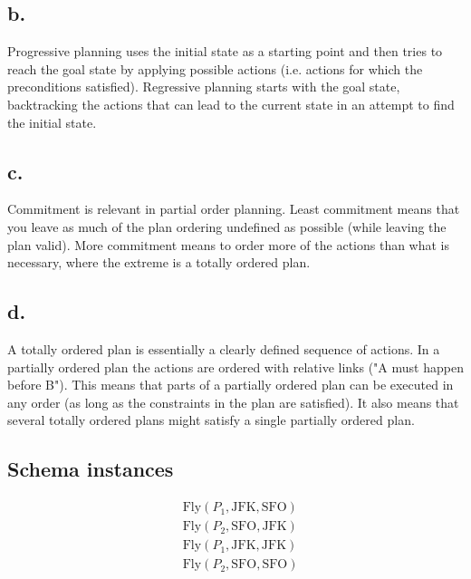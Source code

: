 \documentclass[a4paper, english, 11pt]{article}
\begin{document}
\subsection*{b.}
Progressive planning uses the initial state as a starting point and then tries
to reach the goal state by applying possible actions (i.e. actions for which
the preconditions satisfied). Regressive planning starts with the goal state,
backtracking the actions that can lead to the current state in an attempt to
find the initial state.

\subsection*{c.}
Commitment is relevant in partial order planning. Least commitment means that
you leave as much of the plan ordering undefined as possible (while leaving the
plan valid). More commitment means to order more of the actions than what is
necessary, where the extreme is a totally ordered plan.

\subsection*{d.}
A totally ordered plan is essentially a clearly defined sequence of actions.
In a partially ordered plan the actions are ordered with relative links ("A
must happen before B"). This means that parts of a partially ordered plan can
be executed in any order (as long as the constraints in the plan are
satisfied). It also means that several totally ordered plans might satisfy a
single partially ordered plan.

\subsection*{Schema instances}
\begin{align*}
    &\mathrm{Fly}(P_1, \mathrm{JFK}, \mathrm{SFO})\\
    &\mathrm{Fly}(P_2, \mathrm{SFO}, \mathrm{JFK})\\
    &\mathrm{Fly}(P_1, \mathrm{JFK}, \mathrm{JFK})\\
    &\mathrm{Fly}(P_2, \mathrm{SFO}, \mathrm{SFO})
\end{align*}
\end{document}
